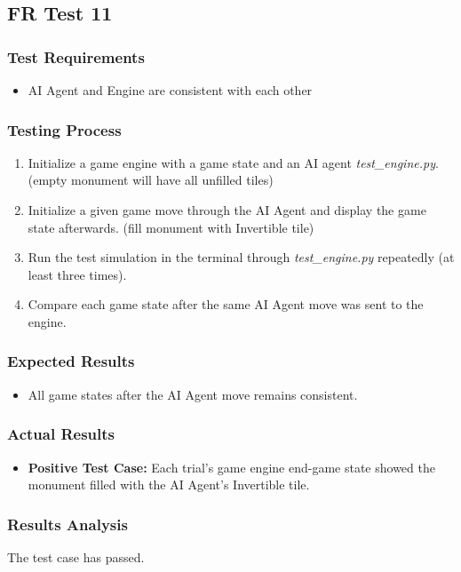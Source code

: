 \documentclass[12pt, titlepage]{article}
\providecommand{\DIFaddbegin}{} %
\providecommand{\DIFaddend}{} %
\begin{document}
\subsection{FR Test 11}\DIFaddbegin \label{FRT11} 
\DIFaddend \subsubsection{Test Requirements}
\begin{itemize}
    \item AI Agent and Engine are consistent with each other
\end{itemize}
\subsubsection{Testing Process}
\begin{enumerate}
    \item Initialize a game engine with a game state and an AI agent \textit{test\_engine.py}. (empty monument will have all unfilled tiles)
    \item Initialize a given game move through the AI Agent and display the game state afterwards. (fill monument with Invertible tile)
    \item Run the test simulation in the terminal through \textit{test\_engine.py} repeatedly (at least three times).
    \item Compare each game state after the same AI Agent move was sent to the engine.
\end{enumerate}
\subsubsection{Expected Results}
\begin{itemize}
    \item All game states after the AI Agent move remains consistent.
\end{itemize}
\subsubsection{Actual Results}
\begin{itemize}
    \item \textbf{Positive Test Case:} Each trial's game engine end-game state showed the monument filled with the AI Agent's Invertible tile.
\end{itemize}
\subsubsection{Results Analysis}
The test case has passed.
\end{document}
